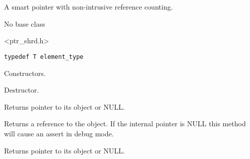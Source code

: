 \section{}\label{wxsharedptr}

A smart pointer with non-intrusive reference counting.


No base class


<ptr\_shrd.h>


{\small%
\begin{verbatim}
typedef T element_type
\end{verbatim}
}%



\label{wxsharedptrwxsharedptr}



Constructors.

\label{wxsharedptrdtor}


Destructor.

\label{wxsharedptrget}


Returns pointer to its object or NULL.

\label{wxsharedptroperatorreft}


Returns a reference to the object. If the internal pointer is NULL this
method will cause an assert in debug mode.

\label{wxsharedptroperatorderef}


Returns pointer to its object or NULL.

\label{wxsharedptroperatorassign}


